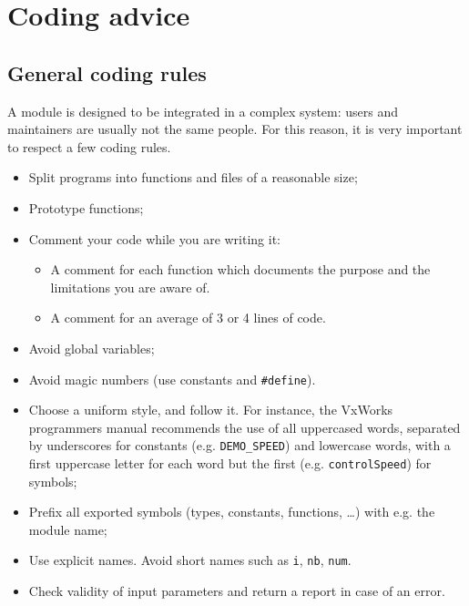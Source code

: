 \section{Coding advice}

\subsection{General coding rules}

A  module is designed  to be  integrated in a  complex system:  users and
maintainers are usually not the same people.  For this reason, it is very
important to respect a few coding rules.

\begin{itemize}
\item Split programs into functions and files of a reasonable size;

\item Prototype functions;

\item Comment your code while you are writing it: 
   \begin{itemize}
   \item A comment for each function which documents the purpose and the
	 limitations you are aware of.
   \item A comment for an average of 3 or 4 lines of code.
   \end{itemize}

\item Avoid global variables;

\item Avoid magic numbers (use constants and \texttt{\#define}).

\item Choose a uniform style, and follow it. For instance, the VxWorks
      programmers manual recommends the use of 
all uppercased  words, separated by underscores  for constants (e.g. 
\texttt{DEMO\_SPEED}) and lowercase words, with a first uppercase letter for each
word but the first (e.g. \texttt{controlSpeed}) for symbols;

\item Prefix all exported symbols (types, constants, functions, \ldots)
with e.g. the module name;

\item Use explicit names. Avoid short names such as \texttt{i}, \texttt{nb},
\texttt{num}.

\item Check validity of input parameters and return a report in case of
an error.
\end{itemize}



